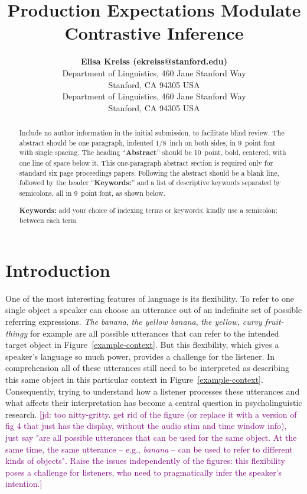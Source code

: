 \documentclass[10pt,letterpaper]{article}
\title{Production Expectations Modulate Contrastive Inference}
\author{{\large \bf Elisa Kreiss (ekreiss@stanford.edu)} \\
  Department of Linguistics, 460 Jane Stanford Way \\
  Stanford, CA 94305 USA
  \AND {\large \bf Judith Degen (jdegen@stanford.edu)} \\
  Department of Linguistics, 460 Jane Stanford Way \\
  Stanford, CA 94305 USA}
\newcommand{\jd}[1]{\textcolor{Purple}{[jd: #1]}}
\begin{document}
\maketitle

\begin{abstract}
Include no author information in the initial submission, to facilitate
blind review.  The abstract should be one paragraph, indented 1/8~inch on both sides,
in 9~point font with single spacing. The heading ``{\bf Abstract}''
should be 10~point, bold, centered, with one line of space below
it. This one-paragraph abstract section is required only for standard
six page proceedings papers. Following the abstract should be a blank
line, followed by the header ``{\bf Keywords:}'' and a list of
descriptive keywords separated by semicolons, all in 9~point font, as
shown below.

\textbf{Keywords:} 
add your choice of indexing terms or keywords; kindly use a
semicolon; between each term
\end{abstract}

\section{Introduction}

One of the most interesting features of language is its flexibility. To refer to one single object a speaker can choose an utterance out of an indefinite set of possible referring expressions. \textit{The banana}, \textit{the yellow banana}, \textit{the yellow, curvy fruit-thingy} for example are all possible utterances that can refer to the intended target object in Figure~\ref{example-context}. But this flexibility, which gives a speaker's language so much power, provides a challenge for the listener. In comprehension all of these utterances still need to be interpreted as describing this same object in this particular context in Figure~\ref{example-context}. Consequently, trying to understand how a listener processes these utterances and what affects their interpretation has become a central question in psycholinguistic research. \jd{too nitty-gritty. get rid of the figure (or replace it with a version of fig 4 that just has the display, without the audio stim and time window info), just say "are all possible utterances that can be used for the same object. At the same time, the same utterance -- e.g., \emph{banana} -- can be used to refer to different kinds of objects". Raise the issues independently of the figures: this flexibility poses a challenge for listeners, who need to pragmatically infer the speaker's intention.}
\end{document}
